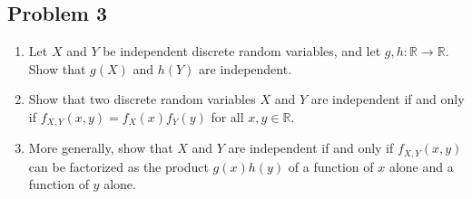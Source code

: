 \documentclass[letterpaper, 11pt]{article}
\newcommand{\1}{\mathds{1}}	%
\theoremstyle{definition}
\begin{document}
    \subsection*{Problem 3}
    \begin{enumerate}
        \item Let $X$ and $Y$ be independent discrete random variables, and let $g, h : \mathbb{R} \rightarrow \mathbb{R}$. Show that $g(X)$ and $h(Y)$ are independent.
        \item Show that two discrete random variables $X$ and $Y$ are independent if and only if $f_{X,Y}(x, y) = f_X(x) f_Y(y)$ for all $x, y \in \mathbb{R}$.
        \item More generally, show that $X$ and $Y$ are independent if and only if $f_{X,Y}(x, y)$ can be factorized as the product $g(x)h(y)$ of a function of $x$ alone and a function of $y$ alone.
    \end{enumerate}
\end{document}
